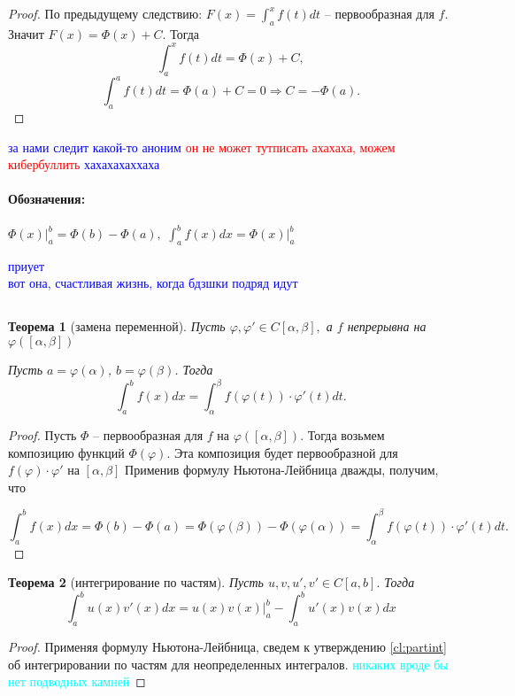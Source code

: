 \documentclass{article}
\theoremstyle{plain}
\newtheorem{theorem}{Теорема}
\theoremstyle{definition}
\theoremstyle{remark}
\begin{document}
\begin{proof}
По предыдущему следствию: $F(x) = \int_a^x f(t)dt$ -- первообразная для $f$.
Значит $F(x) = \Phi(x) + C.$ Тогда
$$\int_a^x f(t)dt =\Phi(x) +C,$$
$$\int_a^a f(t)dt =\Phi(a) +C = 0 \Rightarrow C =-\Phi(a).$$
\end{proof}

\textcolor{blue}{за нами следит какой-то аноним}
\textcolor{red}{он не может тутписать ахахаха, можем кибербуллить}
\textcolor{blue}{хахахахаххаха}
\paragraph{Обозначения:} $\displaystyle\Phi(x) \Big|_a^b = \Phi(b) - \Phi(a),$ $\displaystyle\int_a^b f(x)dx = \Phi(x) \Big|_a^b$


\textcolor{blue}{приует\\
вот она, счастливая жизнь, когда бдзшки подряд идут}

\subsection{}
\begin{theorem}[замена переменной]\label{th:varreplace}
Пусть $\varphi, \varphi' \in C[\alpha, \beta],$ а $f$ непрерывна на $\varphi([\alpha,\beta])$ 
 
Пусть $a=\varphi(\alpha)$, $b = \varphi(\beta)$. Тогда
$$\int_a^bf(x)dx = \int_{\alpha}^{\beta}f(\varphi(t))\cdot \varphi'(t)dt.$$
\end{theorem}
\begin{proof}
Пусть $\Phi$  -- первообразная для $f$ на $\varphi([\alpha,\beta]).$ Тогда возьмем композицию 
функций $\Phi(\varphi)$.
Эта композиция будет первообразной для $f(\varphi) \cdot \varphi'$ на $[\alpha,\beta]$ Применив формулу Ньютона-Лейбница дважды, получим, что 

$$\int_a^bf(x)dx = \Phi(b) - \Phi(a) = \Phi(\varphi(\beta)) - \Phi(\varphi(\alpha)) = \int_{\alpha}^{\beta}f(\varphi(t))\cdot \varphi'(t)dt.$$


\end{proof}


\begin{theorem} [интегрирование по частям]
Пусть $u, v, u', v' \in C[a, b].$ Тогда \begin{equation}\label{eq:partint}
\int_a^b u(x)v'(x)dx = u(x)v(x) \Big|_a^b - \int_a^b u'(x)v(x)dx
\end{equation}
\end{theorem}
\begin{proof}
Применяя формулу Ньютона-Лейбница, сведем к утверждению \ref{cl:partint} об интегрировании по частям для неопределенных интегралов.
\textcolor{cyan}{никаких вроде бы нет подводных камней}
\end{proof}
\end{document}
